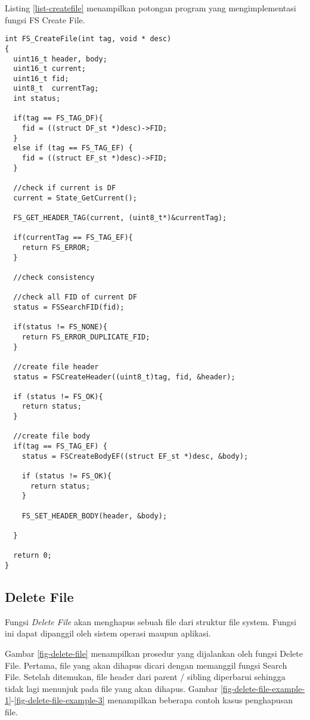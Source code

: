 Listing \ref{list-createfile} menampilkan potongan program yang mengimplementasi fungsi FS Create File.

\begin{lstlisting}[caption={Listing Program Fungsi FS Create File}, label={list-createfile}]
int FS_CreateFile(int tag, void * desc)
{
  uint16_t header, body;
  uint16_t current;
  uint16_t fid;
  uint8_t  currentTag;
  int status;

  if(tag == FS_TAG_DF){
    fid = ((struct DF_st *)desc)->FID;
  }
  else if (tag == FS_TAG_EF) {
    fid = ((struct EF_st *)desc)->FID;
  }

  //check if current is DF
  current = State_GetCurrent();
  
  FS_GET_HEADER_TAG(current, (uint8_t*)&currentTag);
  
  if(currentTag == FS_TAG_EF){
    return FS_ERROR;
  }

  //check consistency

  //check all FID of current DF
  status = FSSearchFID(fid);

  if(status != FS_NONE){
    return FS_ERROR_DUPLICATE_FID;
  }

  //create file header
  status = FSCreateHeader((uint8_t)tag, fid, &header);

  if (status != FS_OK){
    return status;
  }

  //create file body
  if(tag == FS_TAG_EF) {
    status = FSCreateBodyEF((struct EF_st *)desc, &body);

    if (status != FS_OK){
      return status;
    }

    FS_SET_HEADER_BODY(header, &body);

  }

  return 0;
}
\end{lstlisting}


\subsection{Delete File}

Fungsi {\em Delete File} akan menghapus sebuah file dari struktur file system. Fungsi ini dapat dipanggil oleh sistem operasi maupun aplikasi. 

Gambar \ref{fig-delete-file} menampilkan prosedur yang dijalankan oleh fungsi Delete File. Pertama, file yang akan dihapus dicari dengan memanggil fungsi Search File. Setelah ditemukan, file header dari parent / sibling diperbarui sehingga tidak lagi menunjuk pada file yang akan dihapus. Gambar \ref{fig-delete-file-example-1}-\ref{fig-delete-file-example-3} menampilkan beberapa contoh kasus penghapusan file. 

